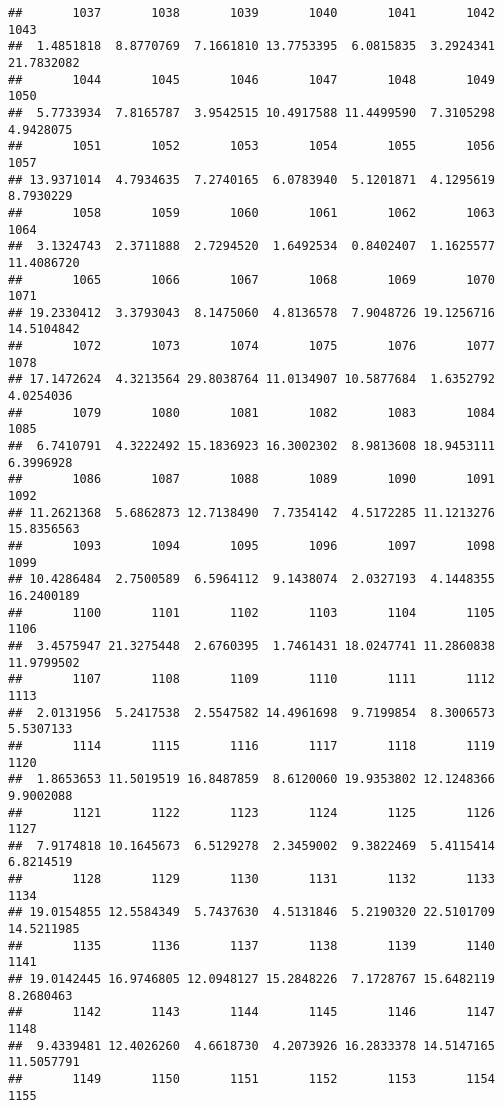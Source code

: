 \documentclass[
]{article}
\begin{document}
\begin{verbatim}
##       1037       1038       1039       1040       1041       1042       1043 
##  1.4851818  8.8770769  7.1661810 13.7753395  6.0815835  3.2924341 21.7832082 
##       1044       1045       1046       1047       1048       1049       1050 
##  5.7733934  7.8165787  3.9542515 10.4917588 11.4499590  7.3105298  4.9428075 
##       1051       1052       1053       1054       1055       1056       1057 
## 13.9371014  4.7934635  7.2740165  6.0783940  5.1201871  4.1295619  8.7930229 
##       1058       1059       1060       1061       1062       1063       1064 
##  3.1324743  2.3711888  2.7294520  1.6492534  0.8402407  1.1625577 11.4086720 
##       1065       1066       1067       1068       1069       1070       1071 
## 19.2330412  3.3793043  8.1475060  4.8136578  7.9048726 19.1256716 14.5104842 
##       1072       1073       1074       1075       1076       1077       1078 
## 17.1472624  4.3213564 29.8038764 11.0134907 10.5877684  1.6352792  4.0254036 
##       1079       1080       1081       1082       1083       1084       1085 
##  6.7410791  4.3222492 15.1836923 16.3002302  8.9813608 18.9453111  6.3996928 
##       1086       1087       1088       1089       1090       1091       1092 
## 11.2621368  5.6862873 12.7138490  7.7354142  4.5172285 11.1213276 15.8356563 
##       1093       1094       1095       1096       1097       1098       1099 
## 10.4286484  2.7500589  6.5964112  9.1438074  2.0327193  4.1448355 16.2400189 
##       1100       1101       1102       1103       1104       1105       1106 
##  3.4575947 21.3275448  2.6760395  1.7461431 18.0247741 11.2860838 11.9799502 
##       1107       1108       1109       1110       1111       1112       1113 
##  2.0131956  5.2417538  2.5547582 14.4961698  9.7199854  8.3006573  5.5307133 
##       1114       1115       1116       1117       1118       1119       1120 
##  1.8653653 11.5019519 16.8487859  8.6120060 19.9353802 12.1248366  9.9002088 
##       1121       1122       1123       1124       1125       1126       1127 
##  7.9174818 10.1645673  6.5129278  2.3459002  9.3822469  5.4115414  6.8214519 
##       1128       1129       1130       1131       1132       1133       1134 
## 19.0154855 12.5584349  5.7437630  4.5131846  5.2190320 22.5101709 14.5211985 
##       1135       1136       1137       1138       1139       1140       1141 
## 19.0142445 16.9746805 12.0948127 15.2848226  7.1728767 15.6482119  8.2680463 
##       1142       1143       1144       1145       1146       1147       1148 
##  9.4339481 12.4026260  4.6618730  4.2073926 16.2833378 14.5147165 11.5057791 
##       1149       1150       1151       1152       1153       1154       1155 

\end{verbatim}
\end{document}
